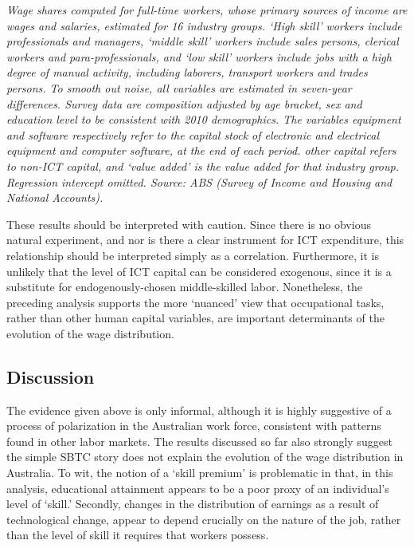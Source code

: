 \begin{table}
{\footnotesize

}
\caption{{\em Wage shares computed for full-time workers, whose primary sources of income are wages and salaries, estimated for 16 industry groups. `High skill' workers include professionals and managers, `middle skill' workers include sales persons, clerical workers and para-professionals, and `low skill' workers include jobs with a high degree of manual activity, including laborers, transport workers and trades persons. To smooth out noise, all variables are estimated in seven-year differences. Survey data are composition adjusted by age bracket, sex and education level to be consistent with 2010 demographics. The variables {\em equipment} and {\em software} respectively refer to the capital stock of electronic and electrical equipment and computer software, at the end of each period. {\em other capital} refers to non-ICT capital, and {\em `value added'} is the value added for that industry group. Regression intercept omitted. Source: ABS (Survey of Income and Housing and National Accounts).}}
\label{tbl:sharereg}
\end{table}

These results should be interpreted with caution. Since there is no obvious natural experiment, and nor is there a clear instrument for ICT expenditure, this relationship should be interpreted simply as a correlation. Furthermore, it is unlikely that the level of ICT capital can be considered exogenous, since it is a substitute for endogenously-chosen middle-skilled labor. Nonetheless, the preceding analysis supports the more `nuanced' view that occupational tasks, rather than other human capital variables, are important determinants of the evolution of the wage distribution.

\subsection{Discussion}

The evidence given above is only informal, although it is highly suggestive of a process of polarization in the Australian work force, consistent with patterns found in other labor markets. The results discussed so far also strongly suggest the simple SBTC story does not explain the evolution of the wage distribution in Australia. To wit, the notion of a `skill premium' is problematic in that, in this analysis, educational attainment appears to be a poor proxy of an individual's level of `skill.' Secondly, changes in the distribution of earnings as a result of technological change, appear to depend crucially on the nature of the job, rather than the level of skill it requires that workers possess.

